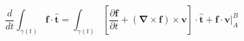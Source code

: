 \newpage
\begin{theorem}
\begin{equation}
  \frac{d}{dt}\int_{\gamma(t)} \bm{f}\cdot\bm{\hat{t}} = 
  \int_{\gamma(t)} \left[ \frac{\partial \bm{f}}{\partial t} + 
  (\bm{\nabla}\times\bm{f})\times\bm{v} \right]\cdot\bm{\hat{t}} +
  \bm{f}\cdot\bm{v}\bigg|_A^B
\end{equation}
\end{theorem}
%
